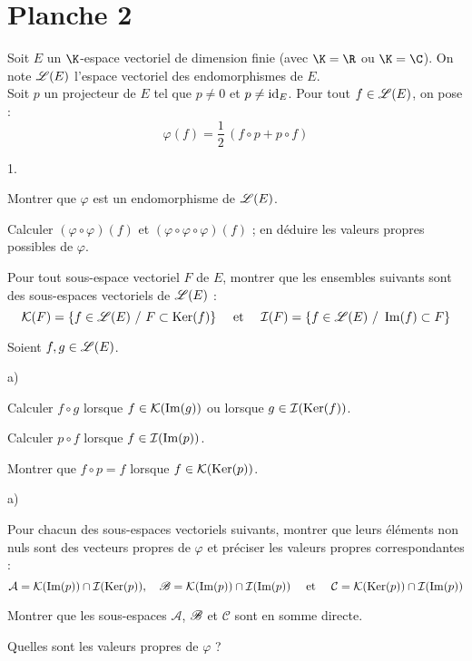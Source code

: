 \documentclass[11pt]{article}%
\begin{document}
\section*{Planche 2} %
\noindent
Soit $E$ un $\K$-espace vectoriel de dimension finie (avec $\K=\R$ 
ou $\K=\C$). On note $\mathscr{L}(E)$ l'espace vectoriel des endomorphismes de 
$E$.\\
Soit $p$ un projecteur de $E$ tel que $p\neq 0$ et $p\neq {\rm{id}}_E$. Pour 
tout $f\in \mathscr{L}(E)$, on pose :
\[
 \varphi(f)=\dfrac{1}{2} \, (f\circ p +p\circ f)
\]
\begin{noliste}{1.}
 \item Montrer que $\varphi$ est un endomorphisme de $\mathscr{L}(E)$.
 
 \item Calculer $(\varphi \circ \varphi)(f)$ et $(\varphi \circ \varphi 
 \circ \varphi)(f)$ ; en déduire les valeurs propres possibles de 
 $\varphi$.
 
 \item Pour tout sous-espace vectoriel $F$ de $E$, montrer que les 
 ensembles suivants sont des sous-espaces vectoriels de $\mathscr{L}(E)$ :
 \[
  \mathcal{K}(F) = \{f\in \mathscr{L}(E) \ / \ F\subset \operatorname{Ker}(f)\} \quad 
  \mbox{ et } \quad \mathcal{I}(F) = \{f\in\mathscr{L}(E) \ / \ \operatorname{Im}(f) 
  \subset F\}
 \]
 
 \item Soient $f,g \in \mathscr{L}(E)$.
 \begin{noliste}{a)}
  \item Calculer $f\circ g$ lorsque $f\in \mathcal{K}(\operatorname{Im}(g))$ ou
  lorsque $g\in \mathcal{I}(\operatorname{Ker}(f))$.
  
  \item Calculer $p\circ f$ lorsque $f\in \mathcal{I}(\operatorname{Im}(p))$.
  
  \item Montrer que $f\circ p=f$ lorsque $f\in \mathcal{K}(\operatorname{Ker}(p))$.
 \end{noliste}
 
 \item 
 \begin{noliste}{a)}
  \item Pour chacun des sous-espaces vectoriels suivants, montrer que 
  leurs éléments non nuls sont des vecteurs propres de $\varphi$ et 
  préciser les valeurs propres correspondantes :
  \[
   \mathcal{A} = \mathcal{K}(\operatorname{Im}(p)) \cap \mathcal{I}(\operatorname{Ker}(p)), \quad 
   \mathscr{B} = \mathcal{K}(\operatorname{Im}(p)) \cap \mathcal{I}(\operatorname{Im}(p)) \quad \mbox{ et }
   \quad \mathcal{C} = \mathcal{K}(\operatorname{Ker}(p)) \cap \mathcal{I}(\operatorname{Im}(p))
  \]
  
  \item Montrer que les sous-espaces $\mathcal{A}$, $\mathscr{B}$ et 
  $\mathcal{C}$ sont en somme directe.
  
  \item Quelles sont les valeurs propres de $\varphi$ ?
 \end{noliste}
\end{noliste}
\end{document}
